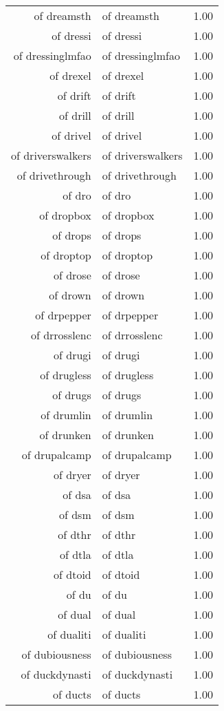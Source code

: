 \begin{table}[ht]
\begin{tabular}{rlr}
  of dreamsth & of dreamsth & 1.00 \\ 
  of dressi & of dressi & 1.00 \\ 
  of dressinglmfao & of dressinglmfao & 1.00 \\ 
  of drexel & of drexel & 1.00 \\ 
  of drift & of drift & 1.00 \\ 
  of drill & of drill & 1.00 \\ 
  of drivel & of drivel & 1.00 \\ 
  of driverswalkers & of driverswalkers & 1.00 \\ 
  of drivethrough & of drivethrough & 1.00 \\ 
  of dro & of dro & 1.00 \\ 
  of dropbox & of dropbox & 1.00 \\ 
  of drops & of drops & 1.00 \\ 
  of droptop & of droptop & 1.00 \\ 
  of drose & of drose & 1.00 \\ 
  of drown & of drown & 1.00 \\ 
  of drpepper & of drpepper & 1.00 \\ 
  of drrosslenc & of drrosslenc & 1.00 \\ 
  of drugi & of drugi & 1.00 \\ 
  of drugless & of drugless & 1.00 \\ 
  of drugs & of drugs & 1.00 \\ 
  of drumlin & of drumlin & 1.00 \\ 
  of drunken & of drunken & 1.00 \\ 
  of drupalcamp & of drupalcamp & 1.00 \\ 
  of dryer & of dryer & 1.00 \\ 
  of dsa & of dsa & 1.00 \\ 
  of dsm & of dsm & 1.00 \\ 
  of dthr & of dthr & 1.00 \\ 
  of dtla & of dtla & 1.00 \\ 
  of dtoid & of dtoid & 1.00 \\ 
  of du & of du & 1.00 \\ 
  of dual & of dual & 1.00 \\ 
  of dualiti & of dualiti & 1.00 \\ 
  of dubiousness & of dubiousness & 1.00 \\ 
  of duckdynasti & of duckdynasti & 1.00 \\ 
  of ducts & of ducts & 1.00 \\ 

\end{tabular}
\end{table}
